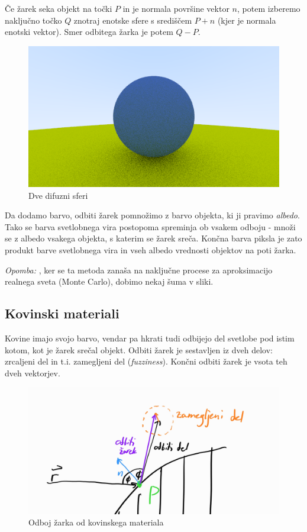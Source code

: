 \documentclass[12pt, a4paper]{article}
\begin{document}
Če žarek seka objekt na točki $P$ in je normala površine vektor $n$, potem izberemo naključno točko $Q$
znotraj enotske sfere s središčem $P + n$ (kjer je normala enotski vektor). Smer odbitega žarka je potem
$Q - P$.

\begin{figure}[H]
	\centering
	\includegraphics[width=400pt]{difuzni}
	\caption{Dve difuzni sferi}
\end{figure}

Da dodamo barvo, odbiti žarek pomnožimo z barvo objekta, ki ji pravimo \textit{albedo}. Tako se barva
svetlobnega vira postopoma spreminja ob vsakem odboju - množi se z albedo vsakega objekta, s katerim se
žarek sreča. Končna barva piksla je zato produkt barve svetlobnega vira in vseh albedo vrednosti
objektov na poti žarka.

\textit{Opomba: }, ker se ta metoda zanaša na naključne procese za aproksimacijo realnega sveta (Monte Carlo),
dobimo nekaj šuma v sliki.

\subsection{Kovinski materiali}

Kovine imajo svojo barvo, vendar pa hkrati tudi odbijejo del svetlobe pod istim kotom, kot je
žarek srečal objekt. Odbiti žarek je sestavljen iz dveh delov: zrcaljeni del in t.i. zamegljeni del
(\textit{fuzziness}). Končni odbiti žarek je vsota teh dveh vektorjev.

\begin{figure}[H]
	\centering
	\includegraphics[width=400pt]{metal}
	\caption{Odboj žarka od kovinskega materiala}
\end{figure}
\end{document}
